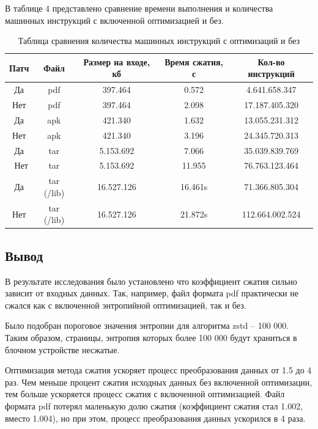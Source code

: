 В таблице 4 представлено сравнение времени выполнения и количества машинных инструкций с включенной оптимизацией и без.

\begin{table}[!htb]
	\label{table:time}
	\begin{center}
		\caption{Таблица сравнения количества машинных инструкций с оптимизаций и без}
		\begin{tabular}{|c|c|c|c|c|}
			\hline
			\bfseries Патч & \bfseries Файл & \bfseries Размер на входе, кб & \bfseries Время сжатия, с& \bfseries Кол-во инструкций \\
			\hline
			Да & pdf & 397.464 & 0.572 & 4.641.658.347 \\ 
			Нет & pdf & 397.464 & 2.098 & 17.187.405.320 \\ \hline
			Да & apk & 421.340 & 1.632 & 13.055.231.312 \\ 
			Нет & apk & 421.340 & 3.196 & 24.345.720.313 \\ \hline
			Да & tar & 5.153.692 & 7.066 & 35.039.839.769 \\ \
			Нет & tar & 5.153.692 & 11.955 & 76.763.123.464 \\ \hline
			Да & tar (/lib) & 16.527.126 & 16.461s & 71.366.805.304 \\
			Нет & tar (/lib) & 16.527.126 & 21.872s & 112.664.002.524 \\ \hline
		\end{tabular}
	\end{center}
\end{table}

\subsection{Вывод}

В результате исследования было установлено что коэффициент сжатия сильно зависит от входных данных. Так, например, файл формата pdf практически не сжался как с включенной энтропийной оптимизацией, так и без.

Было подобран пороговое значения энтропии для алгоритма zstd -- 100 000. Таким образом, страницы, энтропия которых более 100 000 будут храниться в блочном устройстве несжатые. 

Оптимизация метода сжатия ускоряет процесс преобразования данных от 1.5 до 4 раз. Чем меньше процент сжатия исходных данных без включенной оптимизации, тем больше ускоряется процесс сжатия с включенной оптимизацией. Файл формата pdf потерял маленькую долю сжатия (коэффициент сжатия стал 1.002, вместо 1.004), но при этом, процесс преобразования данных ускорился в 4 раза.

